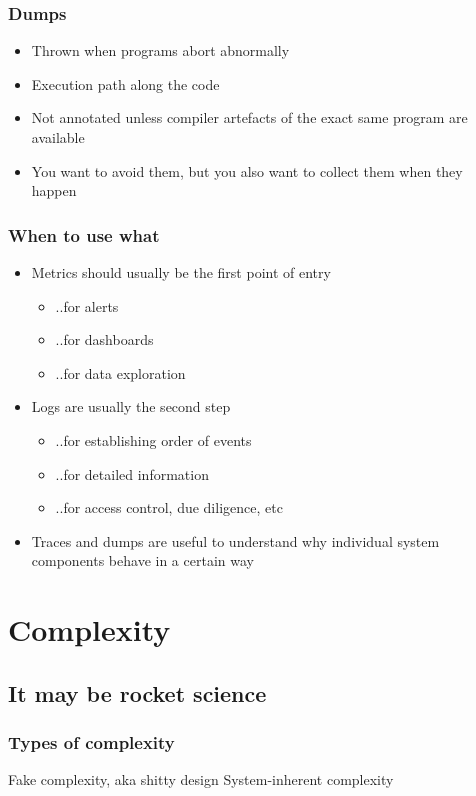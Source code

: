\documentclass[aspectratio=169]{beamer}
\begin{document}
\begin{frame}
	\frametitle{Dumps}
	\begin{itemize}
		\item Thrown when programs abort abnormally
		\item Execution path along the code
		\item Not annotated unless compiler artefacts of the exact same program are available
		\item You want to avoid them, but you also want to collect them when they happen
	\end{itemize}
\end{frame}

\begin{frame}
	\frametitle{When to use what}
	\begin{itemize}
		\item Metrics should usually be the first point of entry
		\begin{itemize}
			\item ..for alerts
			\item ..for dashboards
			\item ..for data exploration
		\end{itemize}
		\item Logs are usually the second step
		\begin{itemize}
			\item ..for establishing order of events
			\item ..for detailed information
			\item ..for access control, due diligence, etc
		\end{itemize}
		\item Traces and dumps are useful to understand why individual system components behave in a certain way
	\end{itemize}
\end{frame}



\section{Complexity}


\subsection{It may be rocket science}

\begin{frame}
	\frametitle{Types of complexity}
	\begin{center}
		\vfill
		Fake complexity, aka shitty design
		\vfill
		System-inherent complexity
		\vfill
	\end{center}
\end{frame}
\end{document}
